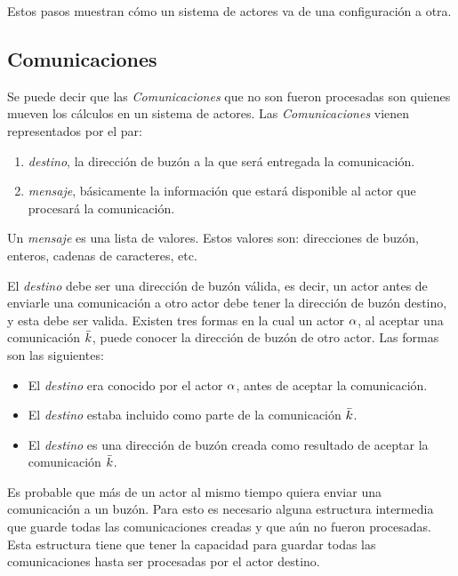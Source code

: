 Estos pasos muestran cómo un sistema de actores va de una configuración a otra. 

\subsection{Comunicaciones}

Se puede decir que las \textit{Comunicaciones} que no son fueron procesadas son quienes mueven los cálculos en un sistema de actores. Las \textit{Comunicaciones} vienen representados por el par:

\begin{enumerate}
\item \textit{destino}, la dirección de buzón a la que será entregada la comunicación. 
\item \textit{mensaje}, básicamente la información que estará disponible al actor que procesará la comunicación.
\end{enumerate}

Un \textit{mensaje} es una lista de valores. Estos valores son: direcciones de buzón, enteros, cadenas de caracteres, etc. 

El \textit{destino} debe ser una dirección de buzón válida, es decir, un actor antes de enviarle una comunicación a otro actor debe tener la dirección de buzón destino, y esta debe ser valida. Existen tres formas en la cual un actor $\alpha$, al aceptar una comunicación $\bar{k}$, puede conocer la dirección de buzón de otro actor. Las formas son las siguientes:

\begin{itemize}
 \item El \textit{destino} era conocido por el actor $\alpha$, antes de aceptar la comunicación.
 \item El \textit{destino} estaba incluido como parte de la comunicación $\bar{k}$.
 \item El \textit{destino} es una dirección de buzón creada como resultado de aceptar la comunicación $\bar{k}$.
\end{itemize}

Es probable que más de un actor al mismo tiempo quiera enviar una comunicación a un buzón. Para esto es necesario alguna estructura intermedia que guarde todas las comunicaciones creadas y que aún no fueron procesadas. Esta estructura tiene que tener la capacidad para guardar todas las comunicaciones hasta ser procesadas por el actor destino. 



